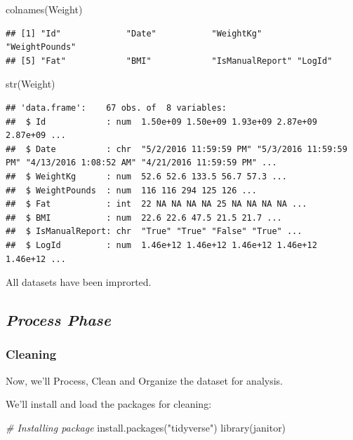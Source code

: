 \documentclass[
]{article}
\newenvironment{Shaded}{\begin{snugshade}}{\end{snugshade}}
\newcommand{\CommentTok}[1]{\textcolor[rgb]{0.56,0.35,0.01}{\textit{#1}}}
\newcommand{\FunctionTok}[1]{\textcolor[rgb]{0.00,0.00,0.00}{#1}}
\newcommand{\NormalTok}[1]{#1}
\newcommand{\StringTok}[1]{\textcolor[rgb]{0.31,0.60,0.02}{#1}}
\begin{document}
\begin{Shaded}
\begin{Highlighting}[]
\FunctionTok{colnames}\NormalTok{(Weight)}
\end{Highlighting}
\end{Shaded}

\begin{verbatim}
## [1] "Id"             "Date"           "WeightKg"       "WeightPounds"  
## [5] "Fat"            "BMI"            "IsManualReport" "LogId"
\end{verbatim}

\begin{Shaded}
\begin{Highlighting}[]
\FunctionTok{str}\NormalTok{(Weight)}
\end{Highlighting}
\end{Shaded}

\begin{verbatim}
## 'data.frame':    67 obs. of  8 variables:
##  $ Id            : num  1.50e+09 1.50e+09 1.93e+09 2.87e+09 2.87e+09 ...
##  $ Date          : chr  "5/2/2016 11:59:59 PM" "5/3/2016 11:59:59 PM" "4/13/2016 1:08:52 AM" "4/21/2016 11:59:59 PM" ...
##  $ WeightKg      : num  52.6 52.6 133.5 56.7 57.3 ...
##  $ WeightPounds  : num  116 116 294 125 126 ...
##  $ Fat           : int  22 NA NA NA NA 25 NA NA NA NA ...
##  $ BMI           : num  22.6 22.6 47.5 21.5 21.7 ...
##  $ IsManualReport: chr  "True" "True" "False" "True" ...
##  $ LogId         : num  1.46e+12 1.46e+12 1.46e+12 1.46e+12 1.46e+12 ...
\end{verbatim}

All datasets have been improrted.

\hypertarget{process-phase}{%
\subsection{\texorpdfstring{\textbf{\emph{Process
Phase}}}{Process Phase}}\label{process-phase}}

\hypertarget{cleaning}{%
\subsubsection{Cleaning}\label{cleaning}}

Now, we'll Process, Clean and Organize the dataset for analysis.

We'll install and load the packages for cleaning:

\begin{Shaded}
\begin{Highlighting}[]
\CommentTok{\# Installing package}
\FunctionTok{install.packages}\NormalTok{(}\StringTok{"tidyverse"}\NormalTok{)}
\FunctionTok{library}\NormalTok{(janitor)}
\end{Highlighting}
\end{Shaded}
\end{document}
